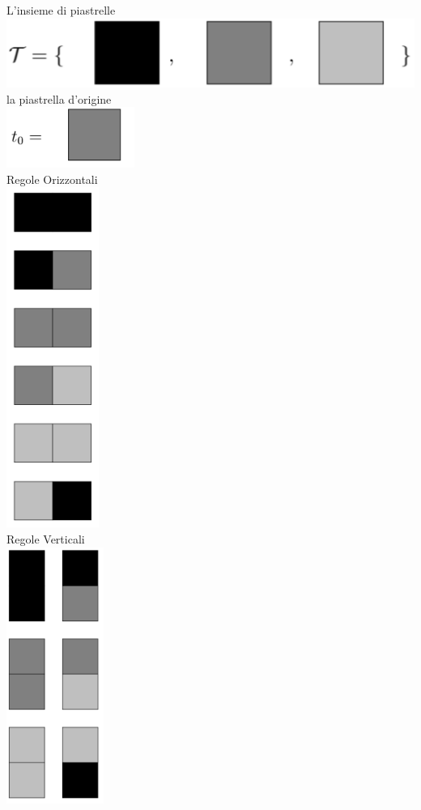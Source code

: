\documentclass[a4paper, 12pt]{article}
\begin{document}
\begin{center}
L'insieme di piastrelle\\
\includegraphics[scale=0.5]{tiling1.png}\\
la piastrella d'origine\\
\includegraphics[scale=0.5]{tiling2.png}\\
Regole Orizzontali\\
\includegraphics[scale=0.4]{regole_orizzontali.png}\\
Regole Verticali\\
\includegraphics[scale=0.4]{regole_verticali.png}\\
\end{center}
\end{document}
